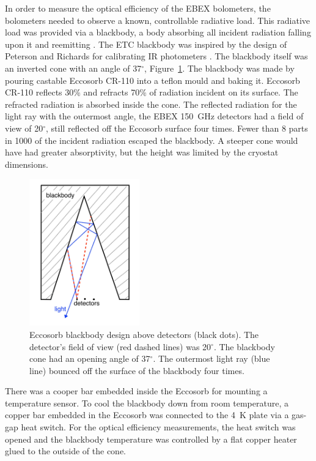 In order to measure the optical efficiency of the \ac{EBEX} bolometers, the bolometers needed to observe a known, controllable radiative load.
This radiative load was provided via a blackbody, a body absorbing all incident radiation falling upon it and reemitting . 
The \ac{ETC} blackbody was inspired by the design of Peterson and Richards for calibrating IR photometers \cite{Peterson1984a}. 
The blackbody itself was an inverted cone with an angle of 37$^{\circ}$, Figure~\ref{fig:blackbody_design}. 
The blackbody was made by pouring castable Eccosorb CR-110 into a teflon mould and baking it.
Eccosorb CR-110 reflects 30\% and refracts 70\% of radiation incident on its surface. %
The refracted radiation is absorbed inside the cone. 
The reflected radiation for the light ray with the outermost angle, the \ac{EBEX} 150~GHz detectors had a field of view of 20$^{\circ}$, still reflected off the Eccosorb surface four times.
Fewer than 8 parts in 1000 of the incident radiation escaped the blackbody. 
A steeper cone would have had greater absorptivity, but the height was limited by the cryostat dimensions. 

\begin{figure}[htp]
\begin{center}
\includegraphics[height=2.5in]{figures/blackbody_design.jpeg}
\caption{Eccosorb blackbody design above detectors (black dots). The detector's field of view (red dashed lines) was 20$^{\circ}$. The blackbody cone had an opening angle of 37$^{\circ}$. The outermost light ray (blue line) bounced off the surface of the blackbody four times. 
\label{fig:blackbody_design} }
\end{center}
\end{figure}

There was a cooper bar embedded inside the Eccosorb for mounting a temperature sensor. %
To cool the blackbody down from room temperature, a copper bar embedded in the Eccosorb was connected to the 4~K plate via a gas-gap heat switch.
For the optical efficiency measurements, the heat switch was opened and the blackbody temperature was controlled by a flat copper heater glued to the outside of the cone.


